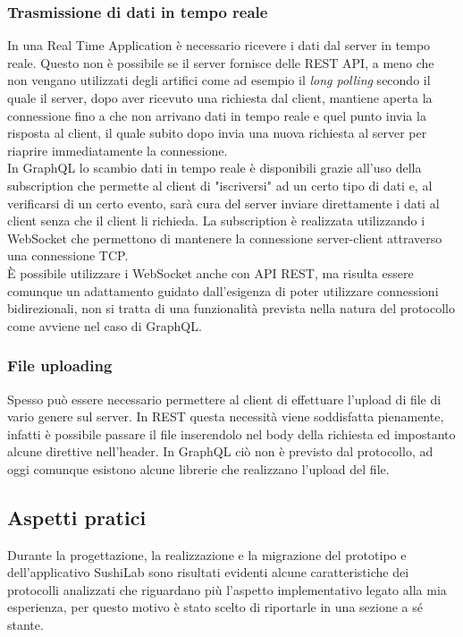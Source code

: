 \subsubsection*{Trasmissione di dati in tempo reale}
In una Real Time Application è necessario ricevere i dati dal server in tempo reale. Questo non è possibile se il server fornisce delle REST API, a meno che non vengano utilizzati degli artifici come ad esempio il \textit{long polling} secondo il quale il server, dopo aver ricevuto una richiesta dal client, mantiene aperta la connessione fino a che non arrivano dati in tempo reale e quel punto invia la risposta al client, il quale subito dopo invia una nuova richiesta al server per riaprire immediatamente la connessione.\\
In GraphQL lo scambio dati in tempo reale è disponibili grazie all'uso della subscription che permette al client di "iscriversi" ad un certo tipo di dati e, al verificarsi di un certo evento, sarà cura del server inviare direttamente i dati al client senza che il client li richieda. La subscription è realizzata utilizzando i WebSocket che permettono di mantenere la connessione server-client attraverso una connessione TCP. \\
È possibile utilizzare i WebSocket anche con API REST, ma risulta essere comunque un adattamento guidato dall'esigenza di poter utilizzare connessioni bidirezionali, non si tratta di una funzionalità prevista nella natura del protocollo come avviene nel caso di GraphQL.
\subsubsection*{File uploading}
Spesso può essere necessario permettere al client di effettuare l'upload di file di vario genere sul server. In REST questa necessità viene soddisfatta pienamente, infatti è possibile passare il file inserendolo nel body della richiesta ed impostanto alcune direttive nell'header. In GraphQL ciò non è previsto dal protocollo, ad oggi comunque esistono alcune librerie che realizzano l'upload del file.
\subsection{Aspetti pratici}
Durante la progettazione, la realizzazione e la migrazione del prototipo e dell'applicativo SushiLab sono risultati evidenti alcune caratteristiche dei protocolli analizzati che riguardano più l'aspetto implementativo legato alla mia esperienza, per questo motivo è stato scelto di riportarle in una sezione a sé stante.
